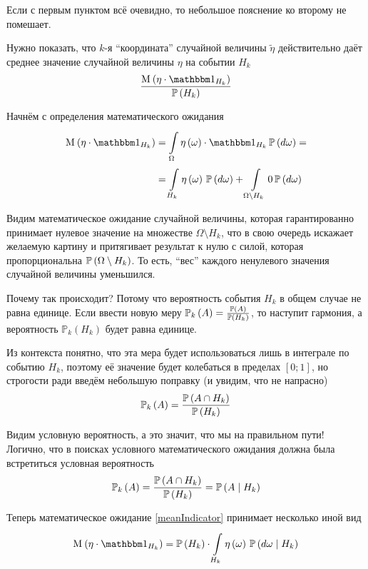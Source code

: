 Если с первым пунктом всё очевидно,
то небольшое пояснение ко второму не помешает.

Нужно показать, что $k$-я ``координата'' случайной величины $\tilde{\eta}$
действительно даёт среднее значение случайной величины $\eta$ на событии $H_k$
$$\frac{\mean{\left( \eta \cdot \indicatorof{H_k} \right)}}{\probability{H_k}}$$

Начнём с определения математического ожидания
\begin{equation}\label{meanIndicator}
    \begin{aligned}
    \mean{\left( \eta \cdot \indicatorof{H_k} \right)}
        &=\integrall{\Omega}{\probability{d\omega}}{
            \eta\left( \omega \right) \cdot \indicatorof{H_k}} =\\
        &=\integrall{H_k}{\probability{d\omega}}{\eta\left( \omega \right)}
            + \integrall{\Omega \setminus H_k}{
                \probability{d\omega}}{0}
    \end{aligned}
\end{equation}

Видим математическое ожидание случайной величины,
которая гарантированно принимает нулевое значение
на множестве $\Omega \setminus H_k$,
что в свою очередь искажает желаемую картину и притягивает результат к нулю
с силой, которая пропорциональна $\mathbb{P}\left( \Omega \setminus H_k \right)$.
То есть, ``вес'' каждого ненулевого значения случайной величины уменьшился.

Почему так происходит?
Потому что вероятность события $H_k$ в общем случае не равна единице.
Если ввести новую меру
$\mathbb{P}_k\left( A \right)=\frac{\mathbb{P}\left( A \right)}{\mathbb{P}\left( H_k \right)}$,
то наступит гармония, а
вероятность $\mathbb{P}_k\left( H_k \right)$ будет равна единице.

Из контекста понятно, что эта мера будет использоваться лишь в интеграле
по событию $H_k$,
поэтому её значение будет колебаться в пределах $\left[ 0;1 \right]$,
но строгости ради введём небольшую поправку (и увидим, что не напрасно)
$$\mathbb{P}_k\left( A \right)
    =\frac{\mathbb{P}\left( A\cap H_k \right)}{\mathbb{P}\left( H_k \right)}$$

Видим условную вероятность, а это значит, что мы на правильном пути!
Логично, что в поисках условного математического ожидания
должна была встретиться условная вероятность
$$\mathbb{P}_k\left( A \right)
    =\frac{\mathbb{P}\left( A\cap H_k \right)}{\mathbb{P}\left( H_k \right)}
    =\mathbb{P}\left( A \mid H_k \right)$$

Теперь математическое ожидание \eqref{meanIndicator}
принимает несколько иной вид
$$\mean{\left( \eta \cdot \indicatorof{H_k} \right)}
        = \probability{H_k}
            \cdot \integrall{H_k}{\probability{d\omega \mid H_k}}{
                \eta\left( \omega \right)}$$

